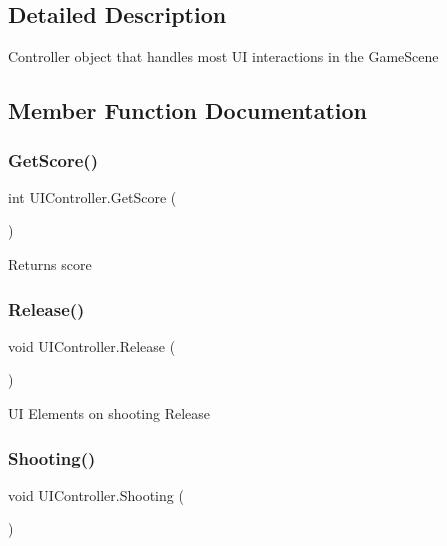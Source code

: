\subsection{Detailed Description}
Controller object that handles most UI interactions in the Game\+Scene 

\subsection{Member Function Documentation}
\mbox{\label{class_u_i_controller_a4d9cf4f88502ba97bf5b1956ba24773d}} 
\subsubsection{\texorpdfstring{Get\+Score()}{GetScore()}}
{\footnotesize\ttfamily int U\+I\+Controller.\+Get\+Score (\begin{DoxyParamCaption}{ }\end{DoxyParamCaption})}

Returns score \mbox{\label{class_u_i_controller_a720867c07d063e353bd105d582ad3646}} 
\subsubsection{\texorpdfstring{Release()}{Release()}}
{\footnotesize\ttfamily void U\+I\+Controller.\+Release (\begin{DoxyParamCaption}{ }\end{DoxyParamCaption})}

UI Elements on shooting Release \mbox{\label{class_u_i_controller_a96b6e594843a18425eddbb2adc5ede02}} 
\subsubsection{\texorpdfstring{Shooting()}{Shooting()}}
{\footnotesize\ttfamily void U\+I\+Controller.\+Shooting (\begin{DoxyParamCaption}{ }\end{DoxyParamCaption})}

